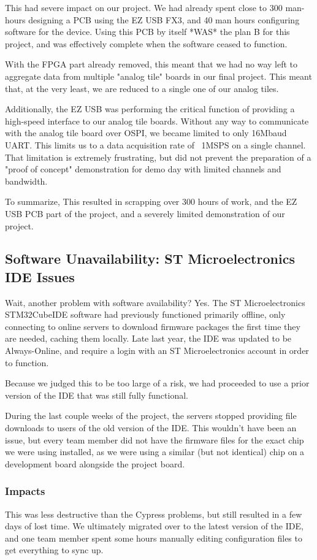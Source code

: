 This had severe impact on our project. We had already spent close to 300 man-hours designing a PCB using the EZ USB FX3, and 40 man hours configuring software for the device. Using this PCB by itself *WAS* the plan B for this project, and was effectively complete when the software ceased to function.

With the FPGA part already removed, this meant that we had no way left to aggregate data from multiple "analog tile" boards in our final project. This meant that, at the very least, we are reduced to a single one of our analog tiles.

Additionally, the EZ USB was performing the critical function of providing a high-speed interface to our analog tile boards. Without any way to communicate with the analog tile board over OSPI, we became limited to only 16Mbaud UART. This limits us to a data acquisition rate of ~1MSPS on a single channel. That limitation is extremely frustrating, but did not prevent the preparation of a "proof of concept" demonstration for demo day with limited channels and bandwidth.

To summarize, This resulted in scrapping over 300 hours of work, and the EZ USB PCB part of the project, and a severely limited demonstration of our project.

\subsection{Software Unavailability: ST Microelectronics IDE Issues}
Wait, another problem with software availability? Yes. The ST Microelectronics STM32CubeIDE software had previously functioned primarily offline, only connecting to online servers to download firmware packages the first time they are needed, caching them locally. Late last year, the IDE was updated to be Always-Online, and require a login with an ST Microelectronics account in order to function. 

Because we judged this to be too large of a risk, we had proceeded to use a prior version of the IDE that was still fully functional.

During the last couple weeks of the project, the servers stopped providing file downloads to users of the old version of the IDE. This wouldn't have been an issue, but every team member did not have the firmware files for the exact chip we were using installed, as we were using a similar (but not identical) chip on a development board alongside the project board.

\subsubsection{Impacts}
This was less destructive than the Cypress problems, but still resulted in a few days of lost time. We ultimately migrated over to the latest version of the IDE, and one team member spent some hours manually editing configuration files to get everything to sync up.

